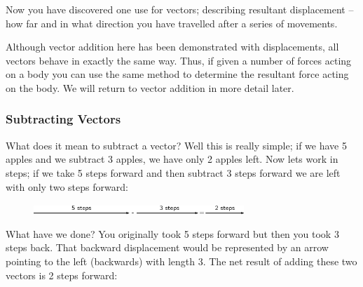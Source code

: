     \addtocounter{footnote}{-0}
    
    \par
  
        
        \label{m38813*id188804}Now you have discovered one use for vectors; describing resultant
displacement -- how far and in what direction you
have travelled after a series of movements.\par 
        \label{m38813*id188810}Although vector addition here has been demonstrated with
displacements, all vectors behave in exactly the same way. Thus, if
given a number of forces acting on a body you can use the same method
to determine the resultant force acting on the body. We will return to
vector addition in more detail later.\par 
      
      \label{m38813*uid36}
            \subsubsection{ Subtracting Vectors}
            \nopagebreak
            
        
        \label{m38813*id188826}What does it mean to subtract a vector? Well this is really simple; if
we have 5 apples and we subtract 3 apples, we have only 2 apples left. Now
lets work in steps; if we take 5 steps forward and then subtract 3 steps
forward we are left with only two steps forward:\par 
        \label{m38813*id188832}
    \setcounter{subfigure}{0}


	\begin{figure}[H] %
    \begin{center}
    \label{m38813*id188835!!!underscore!!!media}\label{m38813*id188835!!!underscore!!!printimage}\includegraphics[width=300px]{col11305.imgs/m38813_PG11C1_029.png} %
        
      \vspace{2pt}
    \vspace{.1in}
    
    \end{center}

 \end{figure}   

    \addtocounter{footnote}{-0}
    
        \par 
        \label{m38813*id188842}What have we done? You originally took 5 steps forward but then you took
3 steps back. That backward displacement would be represented by an arrow
pointing to the left (backwards) with length 3. The net result of
adding these two vectors is 2 steps forward:\par 
        \label{m38813*id188847}
          
